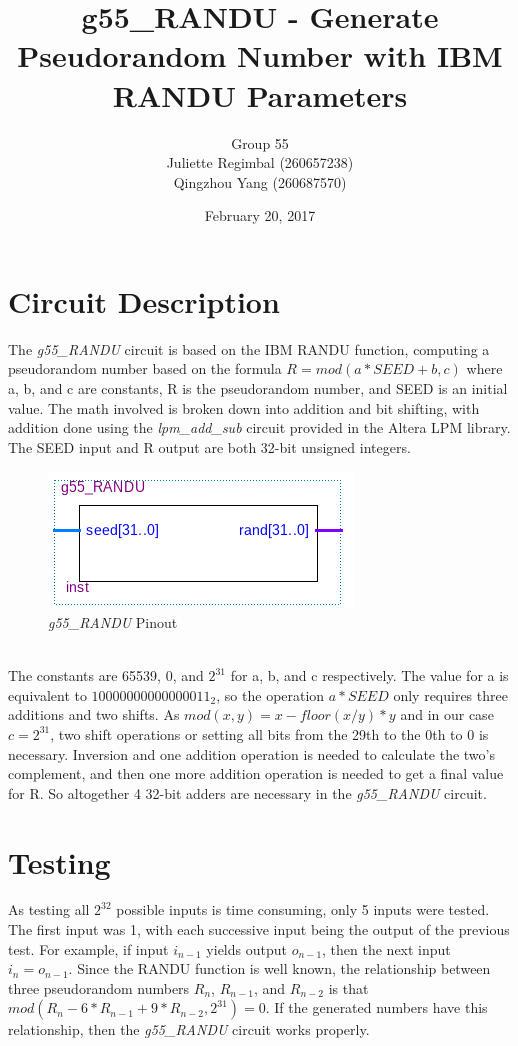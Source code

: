\documentclass[12pt]{article}
\title{g55\_RANDU - Generate Pseudorandom Number with IBM RANDU Parameters}
\author{Group 55\\Juliette Regimbal (260657238)\\Qingzhou Yang (260687570)}
\date{February 20, 2017}
\begin{document}
\maketitle
\setlength{\parindent}{0ex}

\section{Circuit Description}
The \textit{g55\_RANDU} circuit is based on the IBM RANDU function, computing a pseudorandom number based on the formula $R = mod(a*SEED+b, c)$ where a, b, and c are constants, R is the pseudorandom number, and SEED is an initial value. The math involved is broken down into addition and bit shifting, with addition done using the \textit{lpm\_add\_sub} circuit provided in the Altera LPM library. The SEED input and R output are both 32-bit unsigned integers.\\
\begin{figure}[h!t]
\centering
\includegraphics[scale=0.5]{graphics/randu_pinout.png}
\caption{\textit{g55\_RANDU} Pinout}
\end{figure}\\
The constants are 65539, 0, and $2^{31}$ for a, b, and c respectively. The value for a is equivalent to $10000000000000011_2$, so the operation $a*SEED$ only requires three additions and two shifts. As $mod(x, y) = x - floor(x/y)*y$ and in our case $c = 2^{31}$, two shift operations or setting all bits from the 29th to the 0th to 0 is necessary. Inversion and one addition operation is needed to calculate the two's complement, and then one more addition operation is needed to get a final value for R. So altogether 4 32-bit adders are necessary in the \textit{g55\_RANDU} circuit.\\

\section{Testing}
As testing all $2^{32}$ possible inputs is time consuming, only 5 inputs were tested. The first input was 1, with each successive input being the output of the previous test. For example, if input $i_{n-1}$ yields output $o_{n-1}$, then the next input $i_n = o_{n-1}$. Since the RANDU function is well known, the relationship between three pseudorandom numbers $R_n$, $R_{n-1}$, and $R_{n-2}$ is that $mod(R_n - 6 * R_{n-1} + 9 * R_{n-2}, 2^{31}) = 0$. If the generated numbers have this relationship, then the \textit{g55\_RANDU} circuit works properly.\\
\end{document}
